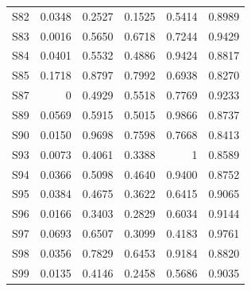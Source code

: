 \begin{longtable}{lrrrrr}
  S82 & 0.0348 & 0.2527 & 0.1525 & 0.5414 & 0.8989 \\
  S83 & 0.0016 & 0.5650 & 0.6718 & 0.7244 & 0.9429 \\
  S84 & 0.0401 & 0.5532 & 0.4886 & 0.9424 & 0.8817 \\
  S85 & 0.1718 & 0.8797 & 0.7992 & 0.6938 & 0.8270 \\
  S87 & 0 & 0.4929 & 0.5518 & 0.7769 & 0.9233 \\
  S89 & 0.0569 & 0.5915 & 0.5015 & 0.9866 & 0.8737 \\
  S90 & 0.0150 & 0.9698 & 0.7598 & 0.7668 & 0.8413 \\
  S93 & 0.0073 & 0.4061 & 0.3388 & 1 & 0.8589 \\
  S94 & 0.0366 & 0.5098 & 0.4640 & 0.9400 & 0.8752 \\
  S95 & 0.0384 & 0.4675 & 0.3622 & 0.6415 & 0.9065 \\
  S96 & 0.0166 & 0.3403 & 0.2829 & 0.6034 & 0.9144 \\
  S97 & 0.0693 & 0.6507 & 0.3099 & 0.4183 & 0.9761 \\
  S98 & 0.0356 & 0.7829 & 0.6453 & 0.9184 & 0.8820 \\
  S99 & 0.0135 & 0.4146 & 0.2458 & 0.5686 & 0.9035 \\
\end{longtable}
